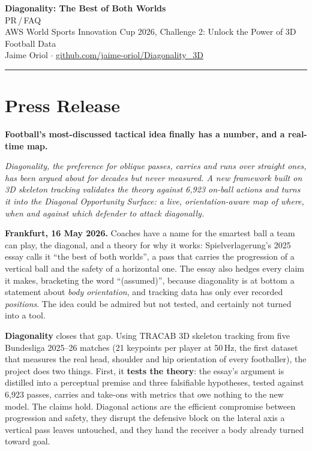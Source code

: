 \documentclass[11pt]{article}
\begin{document}
\begin{center}
{\LARGE\bfseries Diagonality: The Best of Both Worlds}\\[6pt]
{\large\color{accent} PR\,/\,FAQ}\\[4pt]
{\small AWS World Sports Innovation Cup 2026, Challenge 2: Unlock the
Power of 3D Football Data}\\[2pt]
{\small Jaime Oriol \quad$\cdot$\quad
\href{https://github.com/jaime-oriol/Diagonality_3D}{github.com/jaime-oriol/Diagonality\_3D}}
\end{center}

\hrule
\vspace{10pt}

\section{Press Release}

\textbf{\large Football's most-discussed tactical idea finally has a
number, and a real-time map.}

\textit{Diagonality, the preference for oblique passes, carries and runs
over straight ones, has been argued about for decades but never measured.
A new framework built on 3D skeleton tracking validates the theory against
6{,}923 on-ball actions and turns it into the Diagonal Opportunity Surface:
a live, orientation-aware map of where, when and against which defender to
attack diagonally.}

\vspace{6pt}
\textbf{Frankfurt, 16 May 2026.} Coaches have a name for the smartest
ball a team can play, the diagonal, and a theory for why it works:
Spielverlagerung's 2025 essay calls it ``the best of both worlds'', a pass
that carries the progression of a vertical ball and the safety of a
horizontal one. The essay also hedges every claim it makes, bracketing the
word ``(assumed)'', because diagonality is at bottom a statement about
\emph{body orientation}, and tracking data has only ever recorded
\emph{positions}. The idea could be admired but not tested, and certainly
not turned into a tool.

\textbf{Diagonality} closes that gap. Using TRACAB 3D skeleton tracking
from five Bundesliga 2025--26 matches (21 keypoints per player at
50\,Hz, the first dataset that measures the real head, shoulder and hip
orientation of every footballer), the project does two things. First, it
\textbf{tests the theory}: the essay's argument is distilled into a
perceptual premise and three falsifiable hypotheses, tested against
6{,}923 passes, carries and take-ons with metrics that owe nothing to the
new model. The claims hold.
Diagonal actions are the efficient compromise between progression and
safety, they disrupt the defensive block on the lateral axis a vertical
pass leaves untouched, and they hand the receiver a body already turned
toward goal.
\end{document}
